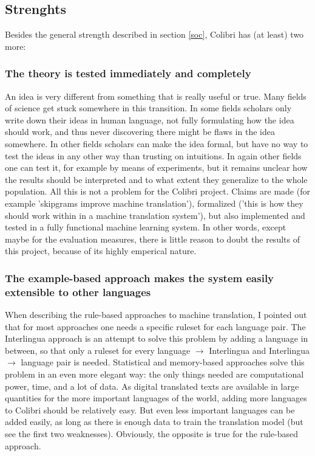 \documentclass[12pt]{article}
\begin{document}
\subsection{Strenghts}

Besides the general strength described in section \ref{soc}, Colibri has (at least) two more:

\subsubsection{The theory is tested immediately and completely}

An idea is very different from something that is really useful or true. Many fields of science get stuck somewhere in this transition. In some fields scholars only write down their ideas in human language, not fully formulating how the idea should work, and thus never discovering there might be flaws in the idea somewhere. In other fields scholars can make the idea formal, but have no way to test the ideas in any other way than trusting on intuitions. In again other fields one can test it, for example by means of experiments, but it remains unclear how the results should be interpreted and to what extent they generalize to the whole population. All this is not a problem for the Colibri project. Claims are made (for example 'skipgrams improve machine translation'), formalized ('this is how they should work within in a machine translation system'), but also implemented and tested in a fully functional machine learning system. In other words, except maybe for the evaluation measures, there is little reason to doubt the results of this project, because of its highly emperical nature. 

\subsubsection{The example-based approach makes the system easily extensible to other languages}

When describing the rule-based approaches to machine translation, I pointed out that for most approaches one needs a specific ruleset for each language pair. The Interlingua approach is an attempt to solve this problem by adding a language in between, so that only a ruleset for every language $\rightarrow$ Interlingua and Interlingua $\rightarrow$ language pair is needed. Statistical and memory-based approaches solve this problem in an even more elegant way: the only things needed are computational power, time, and a lot of data. As digital translated texts are available in large quantities for the more important languages of the world, adding more languages to Colibri should be relatively easy. But even less important languages can be added easily, as long as there is enough data to train the translation model (but see the first two weaknesses). Obviously, the opposite is true for the rule-based approach.
\end{document}
